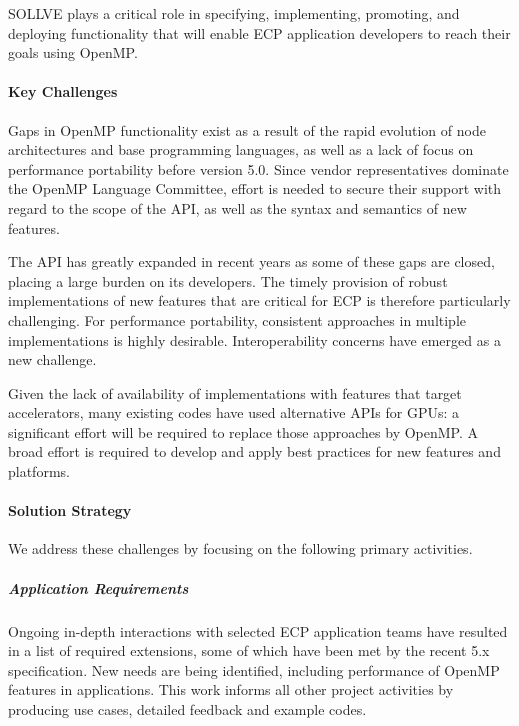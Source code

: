  SOLLVE plays a critical role in specifying, implementing, promoting, and deploying functionality that will enable ECP application developers to reach their goals using OpenMP.

\paragraph{Key Challenges}
Gaps in OpenMP functionality exist as a result of the rapid evolution of node architectures and  base programming languages, as well as a lack of focus on performance portability before version 5.0.  
 Since vendor representatives dominate the  OpenMP Language Committee, effort is needed  to secure their support with regard to the scope of the API, as well as  the syntax and semantics of new features.

The API has greatly expanded in recent years as some of these gaps are closed, placing a large burden on its developers. The timely provision of robust implementations of new features that are critical for ECP is therefore particularly challenging.
For performance portability, consistent approaches in multiple implementations is highly desirable. Interoperability concerns have emerged as a new challenge.

Given the lack of availability of implementations with features that target accelerators, many existing codes have used alternative APIs for GPUs: a significant effort will be required to replace those approaches by OpenMP. A broad effort is required to develop and apply best practices for new features and platforms. 

\paragraph{Solution Strategy}
We address these challenges by focusing on the following primary activities.


\subparagraph{Application Requirements}%
Ongoing in-depth interactions with selected ECP application teams have resulted in a list of required extensions, some of which have been met by the recent 5.x specification.  New needs are being identified, including performance of OpenMP features in applications. This work informs all other project activities by producing use cases, detailed feedback and example codes. 

